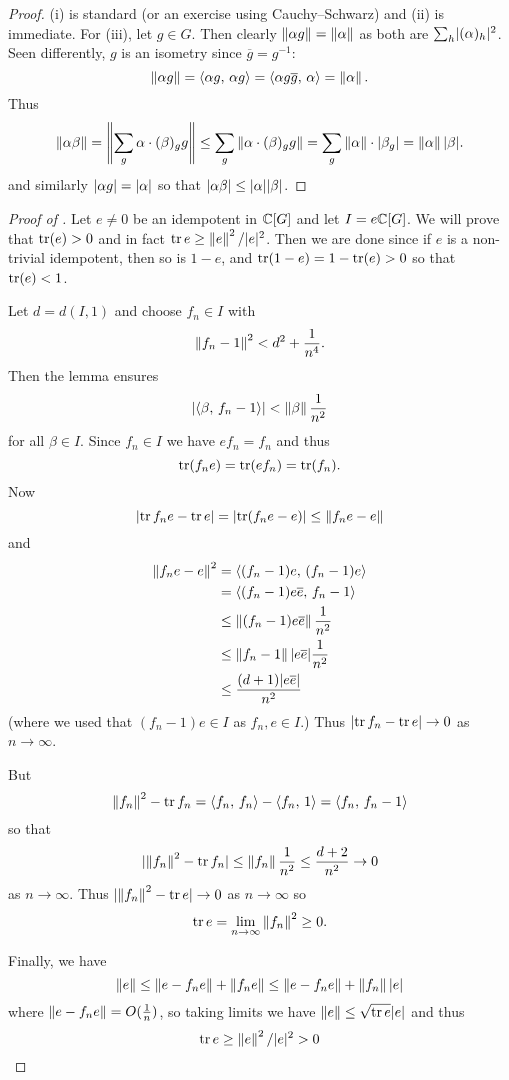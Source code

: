 \begin{proof}
    (i) is standard (or an exercise using Cauchy--Schwarz) and (ii) is immediate.
    For (iii), let $g \in G$.
    Then clearly $\left\lVert \alpha g \right\rVert = \left\lVert \alpha \right\rVert$ as both are $\sum_h \lvert (\alpha)_h \rvert^2$.
    Seen differently, $g$ is an isometry since $\overline{g} = g^{-1}$: \[
        \left\lVert \alpha g \right\rVert = \langle \alpha g, \, \alpha g \rangle = \langle \alpha g \overline{g}, \, \alpha \rangle = \left\lVert \alpha \right\rVert.
    \]
    Thus \[
        \left\lVert \alpha \beta \right\rVert = \left\lVert  \sum_g \alpha \cdot (\beta)_g g  \right\rVert \leq \sum_g \left\lVert  \alpha \cdot (\beta)_g g \right\rVert = \sum_g \left\lVert \alpha \right\rVert \cdot \lvert \beta_g \rvert = \left\lVert \alpha \right\rVert \lvert \beta \rvert.
    \] and similarly $\lvert \alpha g \rvert = \lvert \alpha \rvert$ so that $\lvert \alpha \beta \rvert \leq \lvert \alpha \rvert \lvert \beta \rvert$.
\end{proof}

\begin{proof}[Proof of ]
    Let $e \neq 0$ be an idempotent in $\mathbb{C}[G]$ and let $I = e \mathbb{C}[G]$.
    We will prove that $\operatorname{tr}(e) > 0$ and in fact $\operatorname{tr} e \geq \left\lVert e \right\rVert^2 / \lvert e \rvert^2$.
    Then we are done since if $e$ is a non-trivial idempotent, then so is $1-e$, and $\operatorname{tr}(1-e) = 1 - \operatorname{tr}(e) >  0$ so that $\operatorname{tr}(e) < 1$.

    Let $d = d(I, 1)$ and choose $f_n \in I$ with \[
        \left\lVert f_n - 1 \right\rVert^2 < d^2 + \frac{1}{n^4}.
    \]
    Then the lemma ensures \[
        \lvert \langle \beta, \, f_n - 1 \rangle \rvert < \left\lVert \beta \right\rVert \frac{1}{n^2}
    \] for all $\beta \in I$.
    Since $f_n \in I$ we have $e f_n = f_n$ and thus \[
        \operatorname{tr}(f_n e) = \operatorname{tr}(e f_n) = \operatorname{tr}(f_n).
    \]
    Now \[
        \lvert  \operatorname{tr} f_n e - \operatorname{tr} e \rvert = \lvert \operatorname{tr}(f_n e - e) \rvert \leq \left\lVert f_n e - e \right\rVert
    \] and
    \begin{align*}
        \left\lVert f_n e - e \right\rVert^2
            &= \langle (f_n - 1)e, \, (f_n - 1)e \rangle \\
            &= \langle (f_n - 1)e \overline{e}, \, f_n - 1 \rangle \\
            &\leq \left\lVert (f_n - 1) e \overline{e} \right\rVert \frac{1}{n^2} \\
            &\leq \left\lVert f_n - 1 \right\rVert \lvert e \overline{e} \rvert \frac{1}{n^2} \\
            &\leq \frac{(d+1) \lvert e \overline{e} \rvert}{n^2}
    \end{align*}
    (where we used that $(f_n - 1)e \in I$ as $f_n, e \in I$.)
    Thus $\lvert \operatorname{tr} f_n - \operatorname{tr} e \rvert \to 0$ as $n \to \infty$.

    But \[
        \left\lVert f_n \right\rVert^2 - \operatorname{tr} f_n = \langle f_n, \, f_n \rangle - \langle f_n, \, 1 \rangle = \langle f_n, \, f_n - 1 \rangle
    \] so that \[
        \lvert  \left\lVert f_n \right\rVert^2 - \operatorname{tr} f_n  \rvert \leq \left\lVert f_n \right\rVert \frac{1}{n^2} \leq \frac{d+2}{n^2} \to 0
    \] as $n \to \infty$.
    Thus $\lvert \left\lVert f_n \right\rVert^2 - \operatorname{tr} e \rvert \to 0$ as $n \to \infty$ so \[
        \operatorname{tr} e = \lim_{n \to \infty} \left\lVert f_n \right\rVert^2 \geq 0.
    \]

    Finally, we have \[
        \left\lVert e \right\rVert \leq \left\lVert e - f_n e \right\rVert + \left\lVert f_n e \right\rVert \leq \left\lVert e - f_n e \right\rVert + \left\lVert f_n \right\rVert \lvert e \rvert
    \] where $\left\lVert e - f_n e \right\rVert = O(\frac{1}{n})$, so taking limits we have $\left\lVert e \right\rVert \leq \sqrt{\operatorname{tr} e} \lvert e \rvert$ and thus \[
        \operatorname{tr} e \geq \left\lVert e \right\rVert^2 / \lvert e \rvert^2 > 0
    \]
\end{proof}

